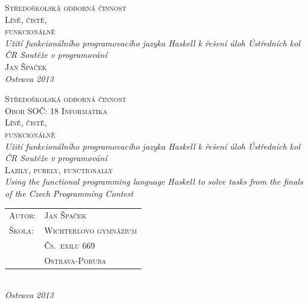 
\setcounter{page}{-99}

\begin{titlepage}
\begin{center}

\textsc{\LARGE Středoškolská odborná činnost}\\[4cm]

\textsc{\Huge Líně, čistě,\\ funkcionálně}\\[0.5cm]

\textit{\LARGE Užití funkcionálního programovacího jazyka Haskell k řešení
úloh Ústředních kol ČR Soutěže v programování}\\[2.5cm]

\textsc{\huge Jan Špaček}\\[11.5cm]

\textit{\LARGE Ostrava 2013}

\end{center}
\end{titlepage}

\thispagestyle{empty}
\cleardoublepage


\begin{center}

\textsc{\LARGE Středoškolská odborná činnost}\\[0.6cm]
\textsc{\large Obor SOČ: 18 Informatika}\\[2cm]

\textsc{\Huge Líně, čistě,\\ funkcionálně}\\[0.5cm]

\textit{\LARGE Užití funkcionálního programovacího jazyka Haskell k řešení
úloh Ústředních kol ČR Soutěže v programování}\\[2cm]

\textsc{\huge Lazily, purely, functionally}\\[0.3cm]

\textit{\Large Using the functional programming language Haskell to solve
tasks from the finals of the Czech Programming Contest}\\[5cm]

\begin{tabularx}{12cm}{
  >{\Large\scshape}p{3cm} 
  >{\LARGE\scshape}X 
}
Autor:    & Jan Špaček \\[0.5cm]
Škola:    & Wichterlovo gymnázium \\[0.15cm]
          & Čs.~exilu 669 \\[0.2cm]
          & Ostrava-Poruba \\
\end{tabularx}
\\[3cm]

\textit{\LARGE Ostrava 2013}

\end{center}

